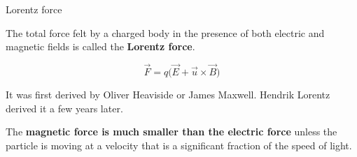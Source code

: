 %
%
%

\begin{frame}{Lorentz force}

The total force felt by a charged body in the presence of
both electric and magnetic fields is called the {\bf Lorentz force}.

\begin{equation*}
  \vec{F} = q \Big( \vec{E} + \vec{u} \times \vec{B} \Big)
\end{equation*}

\vspace{0.3cm}

It was first derived by Oliver Heaviside or James Maxwell.
Hendrik Lorentz derived it a few years later.\\

\vspace{0.3cm}

The {\bf magnetic force is much smaller than the electric force}
unless the particle is moving at a velocity that is a significant fraction of the speed of light.

\end{frame}


%
%

